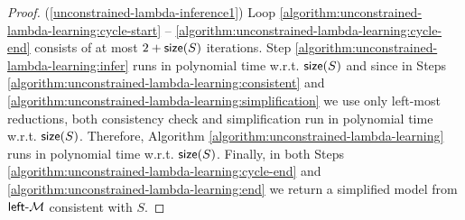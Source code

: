 \begin{proof} (\ref{unconstrained-lambda-inference1}) Loop \ref{algorithm:unconstrained-lambda-learning:cycle-start} -- \ref{algorithm:unconstrained-lambda-learning:cycle-end}  consists of at most $2 + \textup{\sf size}(S)$ iterations. Step \ref{algorithm:unconstrained-lambda-learning:infer} runs in polynomial time w.r.t. $\textup{\sf size}(S)$ and since in Steps \ref{algorithm:unconstrained-lambda-learning:consistent} and \ref{algorithm:unconstrained-lambda-learning:simplification} we use only left-most reductions, both consistency check and simplification run in polynomial time w.r.t. $\textup{\sf size}(S)$. Therefore, Algorithm \ref{algorithm:unconstrained-lambda-learning} runs in polynomial time w.r.t. $\textup{\sf size}(S)$. Finally, in both Steps \ref{algorithm:unconstrained-lambda-learning:cycle-end} and \ref{algorithm:unconstrained-lambda-learning:end} we return a simplified model from $\textup{\sf left-\textup{\sf $\mathcal{M}$}}$ consistent with $S$.


\end{proof}
